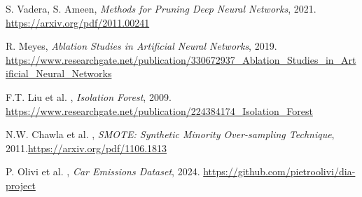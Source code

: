\documentclass[a4paper,12pt]{report}
\begin{document}
\begin{thebibliography}{99}
		S. Vadera, S. Ameen, \emph{Methods for Pruning Deep Neural Networks}, 2021. \url{https://arxiv.org/pdf/2011.00241}
		
		R. Meyes, \emph{Ablation Studies in Artificial Neural Networks}, 2019. \url{https://www.researchgate.net/publication/330672937_Ablation_Studies_in_Artificial_Neural_Networks}
		
		F.T. Liu et al. , \emph{Isolation Forest}, 2009. \url{https://www.researchgate.net/publication/224384174_Isolation_Forest}
		
		N.W. Chawla et al. , \emph{SMOTE: Synthetic Minority Over-sampling Technique}, 2011.\url{https://arxiv.org/pdf/1106.1813}
		
		P. Olivi et al. , \emph{Car Emissions Dataset}, 2024. \url{https://github.com/pietroolivi/dia-project}
	\end{thebibliography}
		
\end{document}
